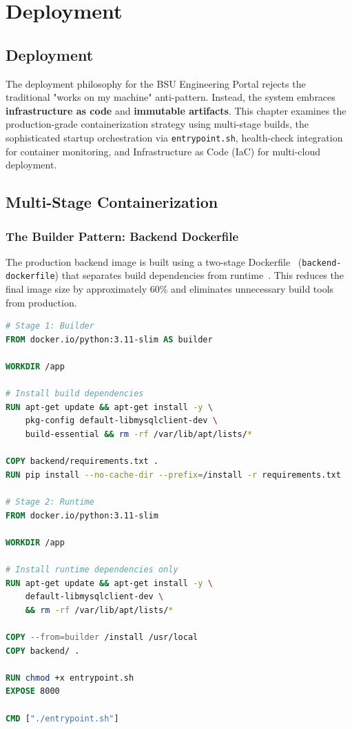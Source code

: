 
\chapter{Deployment}
\label{chap:devops}
\newpage
\section*{Deployment}


The deployment philosophy for the BSU Engineering Portal rejects the traditional "works on my machine" anti-pattern. Instead, the system embraces \textbf{infrastructure as code} and \textbf{immutable artifacts}. This chapter examines the production-grade containerization strategy using multi-stage builds, the sophisticated startup orchestration via \texttt{entrypoint.sh}, health-check integration for container monitoring, and Infrastructure as Code (IaC) for multi-cloud deployment.

\section{Multi-Stage Containerization}
\label{sec:containerization}

\subsection{The Builder Pattern: Backend Dockerfile}

The production backend image is built using a two-stage Dockerfile~\cite{docker} (\texttt{backend-dockerfile}) that separates build dependencies from runtime~\cite{docker-best-practices}. This reduces the final image size by approximately 60\% and eliminates unnecessary build tools from production.

\begin{lstlisting}[float, language=Dockerfile, caption=Backend Multi-Stage Build (\texttt{backend-dockerfile})]
# Stage 1: Builder
FROM docker.io/python:3.11-slim AS builder

WORKDIR /app

# Install build dependencies
RUN apt-get update && apt-get install -y \
    pkg-config default-libmysqlclient-dev \
    build-essential && rm -rf /var/lib/apt/lists/*

COPY backend/requirements.txt .
RUN pip install --no-cache-dir --prefix=/install -r requirements.txt

# Stage 2: Runtime
FROM docker.io/python:3.11-slim

WORKDIR /app

# Install runtime dependencies only
RUN apt-get update && apt-get install -y \
    default-libmysqlclient-dev \
    && rm -rf /var/lib/apt/lists/*

COPY --from=builder /install /usr/local
COPY backend/ .

RUN chmod +x entrypoint.sh
EXPOSE 8000

CMD ["./entrypoint.sh"]
\end{lstlisting}

